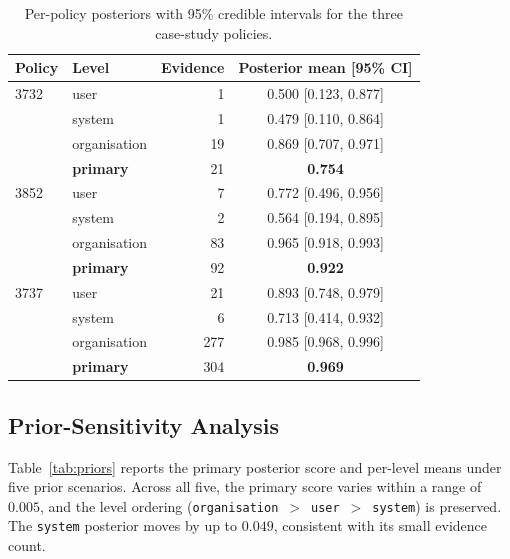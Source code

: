 \documentclass[final,3p,times,twocolumn]{elsarticle}
\begin{document}
	\begin{table}[h]
		\centering
		\caption{Per-policy posteriors with 95\% credible intervals for the three case-study
		policies.}
		\label{tab:posteriors} \scriptsize
		\setlength{\tabcolsep}{3pt}
		\begin{tabular}{@{}l l r c@{}}
			\toprule \textbf{Policy}       & \textbf{Level}   & \textbf{Evidence} & \textbf{Posterior mean [95\% CI]} \\
			\midrule 3732& user             & 1                 & 0.500 [0.123, 0.877]              \\
			                               & system           & 1                 & 0.479 [0.110, 0.864]              \\
			                               & organisation     & 19                & 0.869 [0.707, 0.971]              \\
			                               & \textbf{primary} & 21                & \textbf{0.754}                    \\
			\midrule 3852& user             & 7                 & 0.772 [0.496, 0.956]              \\
			                               & system           & 2                 & 0.564 [0.194, 0.895]              \\
			                               & organisation     & 83                & 0.965 [0.918, 0.993]              \\
			                               & \textbf{primary} & 92                & \textbf{0.922}                    \\
			\midrule 3737& user             & 21                & 0.893 [0.748, 0.979]              \\
			                               & system           & 6                 & 0.713 [0.414, 0.932]              \\
			                               & organisation     & 277               & 0.985 [0.968, 0.996]              \\
			                               & \textbf{primary} & 304               & \textbf{0.969}                    \\
			\bottomrule
		\end{tabular}
	\end{table}

	\subsection{Prior-Sensitivity Analysis}
	\label{sec:prior-sensitivity} Table~\ref{tab:priors} reports the primary
	posterior score and per-level means under five prior scenarios. Across all five,
	the primary score varies within a range of $0.005$, and the level ordering (\texttt{organisation}~$>$~\texttt{user}~$>$~\texttt{system})
	is preserved. The \texttt{system} posterior moves by up to $0.049$, consistent
	with its small evidence count.
\end{document}
